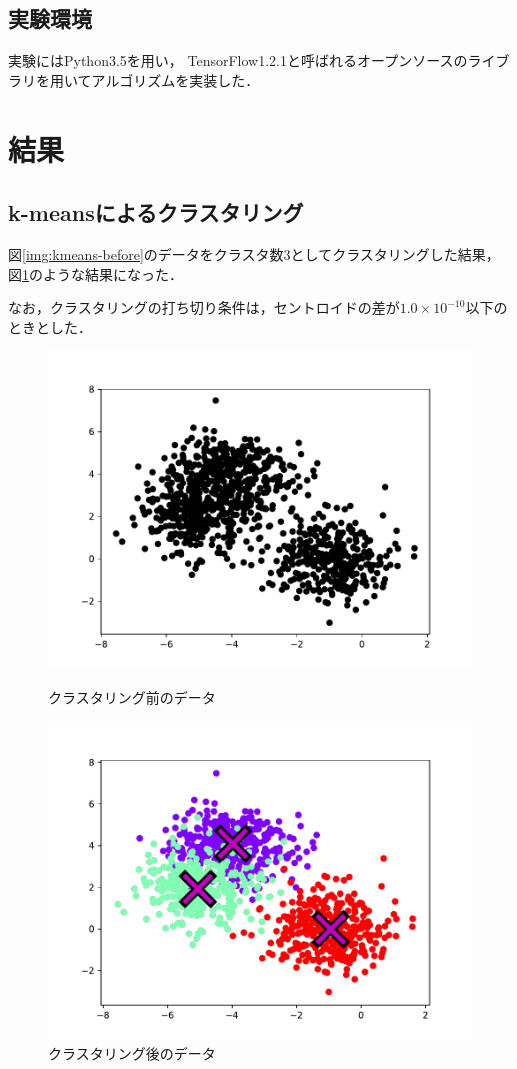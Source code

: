 \documentclass[10pt,a4j,twocolumn]{ltjsarticle}
\def\figref#1{図\ref{#1}}
\begin{document}
\subsection{実験環境}
実験にはPython3.5を用い，
TensorFlow1.2.1と呼ばれるオープンソースのライブラリを用いてアルゴリズムを実装した．

\section{結果}
\subsection{k-meansによるクラスタリング}
\figref{img:kmeans-before}のデータをクラスタ数3としてクラスタリングした結果，
\figref{img:kmeans-after}のような結果になった．

なお，クラスタリングの打ち切り条件は，セントロイドの差が$1.0\times10^{-10}$以下のときとした．
\begin{figure}[htbp]
	\begin{center}
		\includegraphics[width=0.8\linewidth]{img/k-means/before.pdf}
		\caption{クラスタリング前のデータ}
		\label{img:kmeans-before}
	\end{center}
	\begin{center}
		\includegraphics[width=0.8\linewidth]{img/k-means/after.pdf}
		\caption{クラスタリング後のデータ}
		\label{img:kmeans-after}
	\end{center}
\end{figure}
\end{document}
